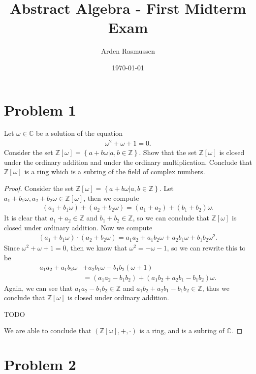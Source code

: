 \documentclass[10pt]{armath}
\title{Abstract Algebra - First Midterm Exam}
\author{Arden Rasmussen}
\date{\today}
\newcommand{\Z}{\mathbb{Z}}
\newcommand{\C}{\mathbb{C}}
\newcommand{\zw}{\mathbb{Z}\left[\omega\right]}
\begin{document}
\maketitle

\section*{Problem 1}%
\label{sec:problem_1}

Let $\omega\in\C$ be a solution of the equation
\begin{align*}
   \omega^2+\omega+1=0.
\end{align*}
Consider the set $\zw=\left\{a+b\omega\vert a,b\in\Z \right\}$. Show that the
set $\zw$ is closed under the ordinary addition and under the ordinary
multiplication. Conclude that $\zw$ is a ring which is a subring of the field of
complex numbers.

\begin{proof}
  Consider the set $\zw=\left\{a+b\omega\vert a,b\in\Z \right\}$. Let
  $a_1+b_1\omega,a_2+b_2\omega\in\zw$, then we compute
  \begin{align*}
    \left(a_1+b_1\omega\right)+\left(a_2+b_2\omega\right)=(a_1+a_2)+(b_1+b_2)\omega.
  \end{align*}
  It is clear that $a_1+a_2\in\Z$ and $b_1+b_2\in\Z$, so we can conclude that
  $\zw$ is closed under ordinary addition. Now we compute
  \begin{align*}
    \left(a_1+b_1\omega\right)\cdot\left(a_2+b_2\omega\right)=a_1a_2+a_1b_2\omega+a_2b_1\omega+b_1b_2\omega^2.
  \end{align*}
  Since $\omega^2+\omega+1=0$, then we know that $\omega^2=-\omega-1$, so we
  can rewrite this to be
  \begin{align*}
    a_1a_2+a_1b_2\omega&+a_2b_1\omega-b_1b_2(\omega+1)\\
                       &=
                       \left(a_1a_2-b_1b_2\right)+\left(a_1b_2+a_2b_1-b_1b_2\right)\omega.
  \end{align*}
  Again, we can see that $a_1a_2-b_1b_2\in\Z$ and $a_1b_2+a_2b_1-b_1b_2\in\Z$,
  thus we conclude that $\zw$ is closed under ordinary addition.

  TODO

  We are able to conclude that $\left(\zw,+,\cdot\right)$ is a ring, and is a
  subring of $\C$.
\end{proof}

\section*{Problem 2}%
\label{sec:problem_2}
\end{document}
